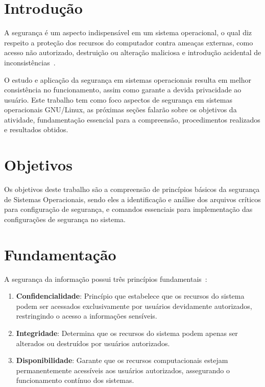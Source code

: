 \documentclass[
    12pt,				%
    oneside,   	        %
    a4paper,			%
    english,			%
    french,				%
    spanish,			%
    brazil,				%
    ]{pacotes/abntex2}
\begin{document}
\tableofcontents*
\cleardoublepage

\textual

\makeatletter
\renewcommand{\chapter}{\@gobbletwo}
\makeatother

\section{Introdução}
\label{sec:introducao}

A segurança é um aspecto indispensável em um sistema operacional, o qual diz respeito a proteção dos recursos do computador contra ameaças externas, como acesso não autorizado, destruição ou alteração maliciosa e introdução acidental de inconsistências~\cite{silberschatz2015}.

O estudo e aplicação da segurança em sistemas operacionais resulta em melhor consistência no funcionamento, assim como garante a devida privacidade ao usuário. Este trabalho tem como foco aspectos de segurança em sistemas operacionais GNU/Linux, as próximas seções falarão sobre os objetivos da atividade, fundamentação essencial para a compreensão, procedimentos realizados e resultados obtidos.

\section{Objetivos}
\label{sec:objetivos}

Os objetivos deste trabalho são a compreensão de princípios básicos da segurança de Sistemas Operacionais, sendo eles a identificação e análise dos arquivos críticos para configuração de segurança, e comandos essenciais para implementação das configurações de segurança no sistema.

\section{Fundamentação}
\label{sec:fundamentacao}

A segurança da informação possui três princípios fundamentais~\cite{maziero2019}:
\begin{enumerate}
    \item \textbf{Confidencialidade}: Princípio que estabelece que os recursos do sistema podem ser acessados exclusivamente por usuários devidamente autorizados, restringindo o acesso a informações sensíveis.
    \item \textbf{Integridade}: Determina que os recursos do sistema podem apenas ser alterados ou destruídos por usuários autorizados.
    \item \textbf{Disponibilidade}: Garante que os recursos computacionais estejam permanentemente acessíveis aos usuários autorizados, assegurando o funcionamento contínuo dos sistemas.
\end{enumerate}
\end{document}
